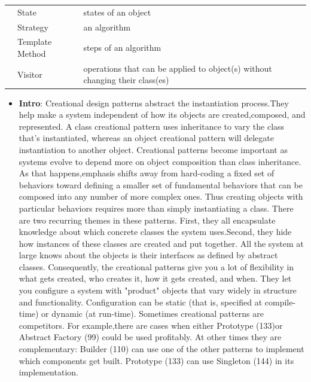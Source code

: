 \documentclass{report}
\begin{document}
\begin{itemize}
\begin{center}
\begin{tabularx}{\textwidth}{@{}llX@{}}
                               &State  &states of an object\\[2ex]
                               &Strategy  &an algorithm\\[2ex]
                               &Template Method  &steps of an algorithm\\[2ex]
                               &Visitor  &operations that can be applied to object(s) without changing their class(es) \\
                    \bottomrule
                \end{tabularx}
            \end{center}
    \end{itemize}

    \pagebreak 
    \begin{itemize}
        \item \textbf{Intro}: Creational design patterns abstract the instantiation process.They help make a system independent of how its objects are created,composed, and represented. A class creational pattern uses inheritance to vary the class that's instantiated, whereas an object creational pattern will delegate instantiation to another object.
            \bigbreak \noindent 
            Creational patterns become important as systems evolve to depend more on object composition than class inheritance. As that happens,emphasis shifts away from hard-coding a fixed set of behaviors toward defining a smaller set of fundamental behaviors that can be composed into any number of more complex ones. Thus creating objects with particular behaviors requires more than simply instantiating a class.
            \bigbreak \noindent 
            There are two recurring themes in these patterns. First, they all encapsulate knowledge about which concrete classes the system uses.Second, they hide how instances of these classes are created and put together. All the system at large knows about the objects is their interfaces as defined by abstract classes. Consequently, the creational patterns give you a lot of flexibility in what gets created, who creates it, how it gets created, and when. They let you configure a system with "product" objects that vary widely in structure and functionality. Configuration can be static (that is, specified at compile-time) or dynamic (at run-time).
            \bigbreak \noindent 
            Sometimes creational patterns are competitors. For example,there are cases when either Prototype (133)or Abstract Factory (99) could be used profitably. At other times they are complementary: Builder (110) can use one of the other patterns to implement which components get built. Prototype (133) can use Singleton (144) in its implementation.

\end{itemize}
\end{document}
